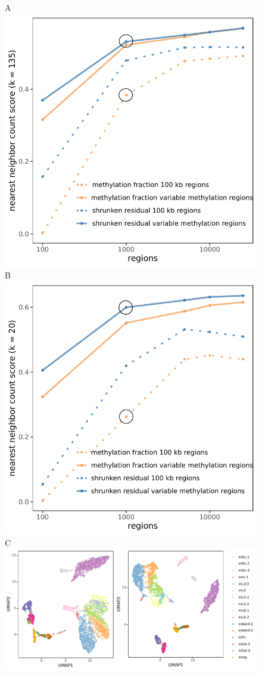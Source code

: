 \documentclass[twocolumn,10pt]{article}
\begin{document}
\begin{figure}[!htp]
	A\\
	\hspace{.3cm}\includegraphics[width=.7\columnwidth]{leonie_plots/complete_135k_12cm_log.pdf} \\
	B\\
	\hspace{.3cm}\includegraphics[width=.7\columnwidth]{leonie_plots/cell500_20k_12cm_log.pdf} \\
	C\\
	\hspace{.39cm}\includegraphics[width=\columnwidth]{leonie_plots/UMAP_fulldataset.pdf}

\end{figure}
\end{document}
